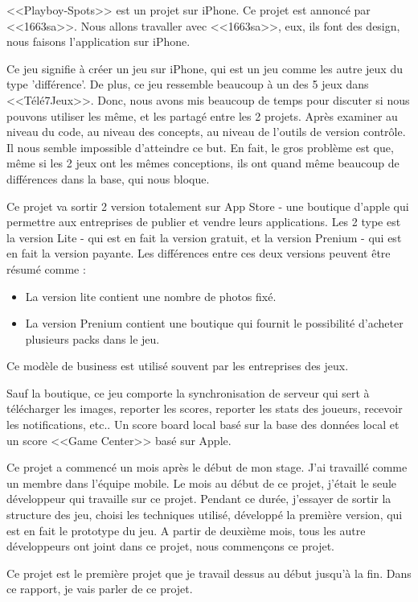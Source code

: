 <<Playboy-Spots>> est un projet sur iPhone. Ce projet est annoncé par <<1663sa>>. Nous allons travaller avec <<1663sa>>, eux, ils font des design, nous faisons l'application sur iPhone. 

Ce jeu signifie à créer un jeu sur iPhone, qui est un jeu comme les autre jeux du type 'différence'. De plus, ce jeu ressemble beaucoup à un des 5 jeux dans <<Télé7Jeux>>. Donc, nous avons mis beaucoup de temps pour discuter si nous pouvons utiliser les même, et les partagé entre les 2 projets. Après examiner au niveau du code, au niveau des concepts, au niveau de l'outils de version contrôle. Il nous semble impossible d'atteindre ce but. En fait, le gros problème est que, même si les 2 jeux ont les mêmes conceptions, ils ont quand même beaucoup de différences dans la base, qui nous bloque.

Ce projet va sortir 2 version totalement sur App Store - une boutique d'apple qui permettre aux entreprises de publier et vendre leurs applications. Les 2 type est la version Lite - qui est en fait la version gratuit, et la version Prenium - qui est en fait la version payante. Les différences entre ces deux versions peuvent être résumé comme : 
\begin{itemize}
	\item La version lite contient une nombre de photos fixé. 
	\item La version Prenium contient une boutique qui fournit le possibilité d'acheter plusieurs packs dans le jeu. 
\end{itemize}
Ce modèle de business est utilisé souvent par les entreprises des jeux. 

Sauf la boutique, ce jeu comporte la synchronisation de serveur qui sert à télécharger les images, reporter les scores, reporter les stats des joueurs, recevoir les notifications, etc.. Un score board local basé sur la base des données local et un score <<Game Center>> basé sur Apple.

Ce projet a commencé un mois après le début de mon stage. J'ai travaillé comme un membre dans l'équipe mobile. Le mois au début de ce projet, j'était le seule développeur qui travaille sur ce projet. Pendant ce durée, j'essayer de sortir la structure des jeu, choisi les techniques utilisé, développé la première version, qui est en fait le prototype du jeu. A partir de deuxième mois, tous les autre développeurs ont joint dans ce projet, nous commençons ce projet.

Ce projet est le première projet que je travail dessus au début jusqu'à la fin. Dans ce rapport, je vais parler de ce projet.



